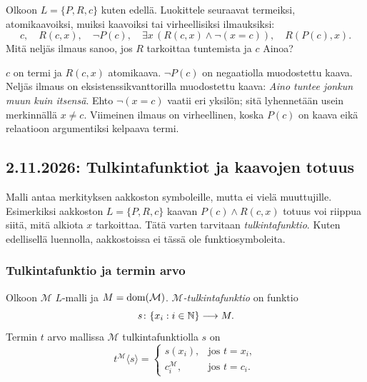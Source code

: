 \documentclass[11pt,a4paper]{amsart}
\begin{document}
\begin{exercise}
  Olkoon $L=\{P,R,c\}$ kuten edellä. Luokittele seuraavat termeiksi,
  atomikaavoiksi, muiksi kaavoiksi tai virheellisiksi ilmauksiksi:
  \[
    c,\quad R(c,x),\quad \neg P(c),\quad
    \exists x\,(R(c,x)\land\neg(x=c)),\quad R(P(c),x).
  \]
  Mitä neljäs ilmaus sanoo, jos $R$ tarkoittaa tuntemista ja $c$ Ainoa?
\end{exercise}

\begin{solution}
  $c$ on termi ja $R(c,x)$ atomikaava. $\neg P(c)$ on negaatiolla
  muodostettu kaava. Neljäs ilmaus on eksistenssikvanttorilla
  muodostettu kaava: \emph{Aino tuntee jonkun muun kuin itsensä}.
  Ehto $\neg(x=c)$ vaatii eri yksilön; sitä lyhennetään usein
  merkinnällä $x\ne c$. Viimeinen ilmaus on virheellinen, koska
  $P(c)$ on kaava eikä relaatioon argumentiksi kelpaava termi.
\end{solution}

\clearpage
\subsection{2.11.2026: Tulkintafunktiot ja kaavojen totuus}

Malli antaa merkityksen aakkoston symboleille, mutta ei vielä muuttujille.
Esimerkiksi aakkoston $L=\{P,R,c\}$ kaavan $P(c)\land R(c,x)$
totuus voi riippua siitä, mitä alkiota $x$ tarkoittaa. Tätä varten
tarvitaan \emph{tulkintafunktio}. Kuten edellisellä luennolla,
aakkostoissa ei tässä ole funktiosymboleita.

\subsubsection{Tulkintafunktio ja termin arvo}

\begin{definition}
  Olkoon $\mathcal M$ $L$-malli ja $M=\operatorname{dom}(\mathcal M)$.
  \emph{$\mathcal M$-tulkintafunktio} on funktio
  \[
    s\colon\{x_i:i\in\mathbb{N}\}\longrightarrow M.
  \]
  Termin $t$ arvo mallissa $\mathcal M$ tulkintafunktiolla $s$ on
  \[
    t^{\mathcal M}\langle s\rangle=
    \begin{cases}
      s(x_i),&\text{jos }t=x_i,\\
      c_i^{\mathcal M},&\text{jos }t=c_i.
    \end{cases}
  \]
\end{definition}
\end{document}
